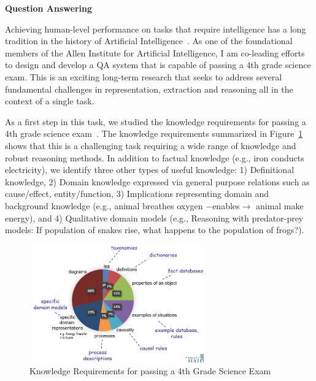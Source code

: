 \documentclass[a4paper,11pt,onecolumn]{article}
\begin{document}
{\bf Question Answering}

Achieving human-level performance on tasks that require intelligence has a long tradition in the history of Artificial Intelligence~\cite{}. As one of the foundational members of the Allen Institute for Artificial Intelligence, I am co-leading efforts to design and develop a QA system that is capable of passing a 4th grade science exam. This is an exciting long-term research that seeks to address several fundamental challenges in representation, extraction and reasoning all in the context of a single task.

As a first step in this task, we studied the knowledge requirements for passing a 4th grade science exam~\cite{clark-akbc13}. The knowledge requirements summarized in Figure~\ref{fig:akbc} shows that this is a challenging task requiring a wide range of knowledge and robust reasoning methods. In addition to factual knowledge (e.g., iron conducts electricity), we identify three other types of useful knowledge: 1) Definitional knowledge, 2) Domain knowledge expressed via general purpose relations such as cause/effect, entity/function, 3) Implications representing domain and background knowledge (e.g., animal breathes oxygen $-$enables$\rightarrow$ animal make energy), and 4) Qualitative domain models (e.g., Reasoning with predator-prey models: If population of snakes rise, what happens to the population of frogs?).

\begin{figure}
	\vspace{-2ex}
	\begin{center}
	\includegraphics[width=3in,height=2in]{figures/akbc} 	
	\vspace{-2ex}
	\caption{\label{fig:akbc} {\small Knowledge Requirements for passing a 4th Grade Science Exam}}
	\vspace{-2ex}
	\end{center}
\end{figure}
\end{document}
